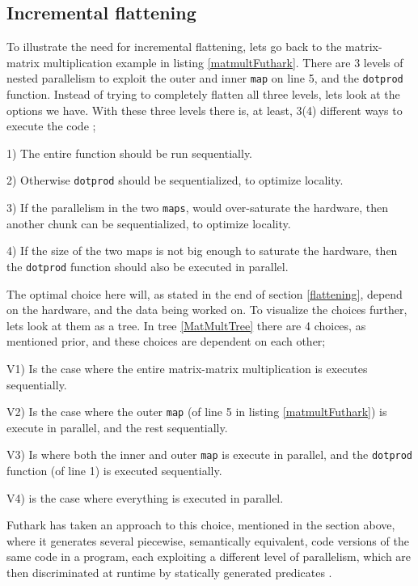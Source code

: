 \subsection{Incremental flattening}
To illustrate the need for incremental flattening, lets go back to the matrix-matrix multiplication example in listing \ref{matmultFuthark}. There are 3 levels of nested parallelism to exploit the outer and inner \texttt{map} on line 5, and the \texttt{dotprod} function. Instead of trying to completely flatten all three levels, lets look at the options we have. With these three levels there is, at least, 3(4) different ways to execute the code \cite{inc-flat};
\begin{inparadesc}
	\item[1)] The entire function should be run sequentially.
	\item[2)] Otherwise \texttt{dotprod} should be sequentialized, to optimize locality.
	\item[3)] If the parallelism in the two \texttt{maps}, would over-saturate the hardware, then another chunk can be sequentialized, to optimize locality. 
	\item[4)] If the size of the two maps is not big enough to saturate the hardware, then the \texttt{dotprod} function should also be executed in parallel.
\end{inparadesc} 
The optimal choice here will, as stated in the end of section \ref{flattening}, depend on the hardware, and the data being worked on. To visualize the choices further, lets look at them as a tree. In tree \ref{MatMultTree} there are 4 choices, as mentioned prior, and these choices are dependent on each other; \begin{inparadesc}
	\item[V1)] Is the case where the entire matrix-matrix multiplication is executes sequentially.
	\item[V2)] Is the case where the outer \texttt{map} (of line 5 in listing \ref{matmultFuthark}) is execute in parallel, and the rest sequentially. 
	\item[V3)] Is where both the inner and outer \texttt{map} is execute in parallel, and the \texttt{dotprod} function (of line 1) is executed sequentially.  
	\item[V4)] is the case where everything is executed in parallel.
\end{inparadesc} 
\begin{center}
	\centering 
	
	\label{MatMultTree}
\end{center}
Futhark has taken an approach to this choice, mentioned in the section above, where it generates several piecewise, semantically equivalent, code versions of the same code in a program, each exploiting a different level of parallelism, which are then discriminated at runtime by statically generated predicates \cite{inc-flat}.

